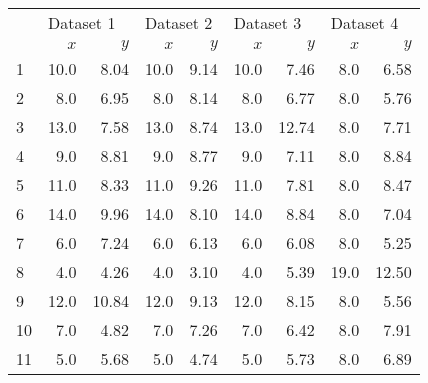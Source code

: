 \documentclass[11pt]{beamer}
\begin{document}

\begin{frame}

\begin{tabular}{lrr|rr|rr|rr}
	\toprule
	{} & \multicolumn{2}{l}{Dataset 1} & \multicolumn{2}{|l|}{Dataset 2} & \multicolumn{2}{l}{Dataset 3} & \multicolumn{2}{|l}{Dataset 4} \\
	{} &       $x$ &    $y$ &       $x$ &   $y$ &       $x$ &    $y$ &  $x$ &    $y$ \\
	\midrule
	1  &      10.0 &   8.04 &      10.0 &  9.14 &      10.0 &   7.46 &       8.0 &  6.58 \\
	2  &       8.0 &   6.95 &       8.0 &  8.14 &       8.0 &   6.77 &       8.0 &  5.76 \\
	3  &      13.0 &   7.58 &      13.0 &  8.74 &      13.0 &  12.74 &       8.0 &  7.71 \\
	4  &       9.0 &   8.81 &       9.0 &  8.77 &       9.0 &   7.11 &       8.0 &  8.84 \\
	5  &      11.0 &   8.33 &      11.0 &  9.26 &      11.0 &   7.81 &       8.0 &  8.47 \\
	6  &      14.0 &   9.96 &      14.0 &  8.10 &      14.0 &   8.84 &       8.0 &  7.04 \\
	7  &       6.0 &   7.24 &       6.0 &  6.13 &       6.0 &   6.08 &       8.0 &  5.25 \\
	8  &       4.0 &   4.26 &       4.0 &  3.10 &       4.0 &   5.39 &      19.0 &  12.50 \\
	9  &      12.0 &  10.84 &      12.0 &  9.13 &      12.0 &   8.15 &       8.0 &  5.56 \\
	10 &       7.0 &   4.82 &       7.0 &  7.26 &       7.0 &   6.42 &       8.0 &  7.91 \\
	11 &       5.0 &   5.68 &       5.0 &  4.74 &       5.0 &   5.73 &       8.0 &  6.89 \\
	\bottomrule
\end{tabular}

\end{frame}
\end{document}
